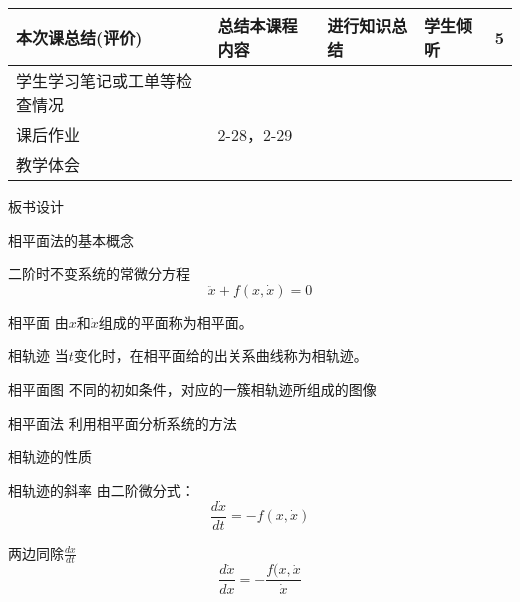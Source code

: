 {\begin{landscape}
\begin{longtable}{|m{10mm}|m{50mm}|m{50mm}|m{50mm}|m{15mm}|}
\centering 本次课总结(评价)&总结本课程内容 &进行知识总结 &学生倾听 &5 \\\hline
\centering 学生学习笔记或工单等检查情况&\multicolumn{4}{m{165mm}|}{\quad}\\\hline
\centering 课后作业&\multicolumn{4}{m{165mm}|}{2-28，2-29}\\\hline
\centering 教学体会&\multicolumn{4}{m{165mm}|}{\quad}\\
\end{longtable}

\end{landscape}
\clearpage
\begin{center}
{\huge 板书设计}
\end{center}
}

 \begin{frame}{相平面法的基本概念} 
 \begin{block}{二阶时不变系统的常微分方程}
 \[\ddot{x}+f(x,\dot{x})=0\]
 \end{block}
 \begin{block}{相平面}
 由$x$和$\dot{x}$组成的平面称为相平面。
 \end{block}
 \begin{block}{相轨迹}
 当$t$变化时，在相平面给的出关系曲线称为相轨迹。
 \end{block}
 \end{frame}
 
 \begin{frame}
 \begin{block}{相平面图}
 不同的初如条件，对应的一簇相轨迹所组成的图像
 \end{block}
 \begin{block}{相平面法}
 利用相平面分析系统的方法
 \end{block}
 \end{frame}

\begin{frame}{相轨迹的性质}
\begin{block}{相轨迹的斜率}
由二阶微分式：
\[\frac{d\dot{x}}{dt}=-f(x,\dot{x})\]

两边同除$\frac{dx}{dt}$
\[\frac{d\dot{x}}{dx}=-\frac{f(x,\dot{x}}{\dot{x}}\]

\end{block}
\end{frame}

